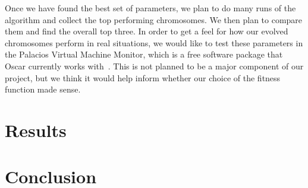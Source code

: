 \documentclass[11pt]{article}
\begin{document}
Once we have found the best set of parameters, we plan to do many runs of the algorithm and collect the top performing chromosomes. We then plan to compare them and find the overall top three. In order to get a feel for how our evolved chromosomes perform in real situations, we would like to test these parameters in the Palacios Virtual Machine Monitor, which is a free software package that Oscar currently works with~\cite{Mondragon:13}. This is not planned to be a major component of our project, but we think it would help inform whether our choice of the fitness function made sense. 

\section{Results}

\section{Conclusion}



\end{document}
